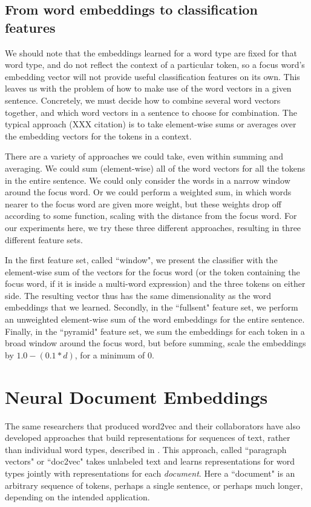 \subsection{From word embeddings to classification features}
We should note that the embeddings learned for a word type are fixed for that
word type, and do not reflect the context of a particular token, so a focus
word's embedding vector will not provide useful classification features on its
own. This leaves us with the problem of how to make use of the word vectors in
a given sentence. Concretely, we must decide how to combine several word
vectors together, and which word vectors in a sentence to choose for
combination. The typical approach (XXX citation) is to take element-wise sums
or averages over the embedding vectors for the tokens in a context.

There are a variety of approaches we could take, even within summing and
averaging. We could sum (element-wise) all of the word vectors for all the
tokens in the entire sentence. We could only consider the words in a narrow
window around the focus word. Or we could perform a weighted sum, in which
words nearer to the focus word are given more weight, but these weights drop
off according to some function, scaling with the distance from the focus word.
For our experiments here, we try these three different approaches, resulting in
three different feature sets.

In the first feature set, called ``window", we present the classifier with the
element-wise sum of the vectors for the focus word (or the token containing the
focus word, if it is inside a multi-word expression) and the three tokens on
either side. The resulting vector thus has the same dimensionality as the word
embeddings that we learned. Secondly, in the ``fullsent" feature set, we
perform an unweighted element-wise sum of the word embeddings for the entire
sentence. Finally, in the ``pyramid" feature set, we sum the embeddings for
each token in a broad window around the focus word, but before summing, scale
the embeddings by $1.0 - (0.1 * d) $, for a minimum of 0.



\section{Neural Document Embeddings}
The same researchers that produced word2vec and their collaborators have also
developed approaches that build representations for sequences of text, rather
than individual word types, described in
\cite{dai-document-embedding-2015,quocle-distributed-representations-2014}.
This approach, called ``paragraph vectors" or ``doc2vec" takes unlabeled text
and learns representations for word types jointly with representations for each
\emph{document}. Here a ``document" is an arbitrary sequence of tokens, perhaps
a single sentence, or perhaps much longer, depending on the intended
application.

